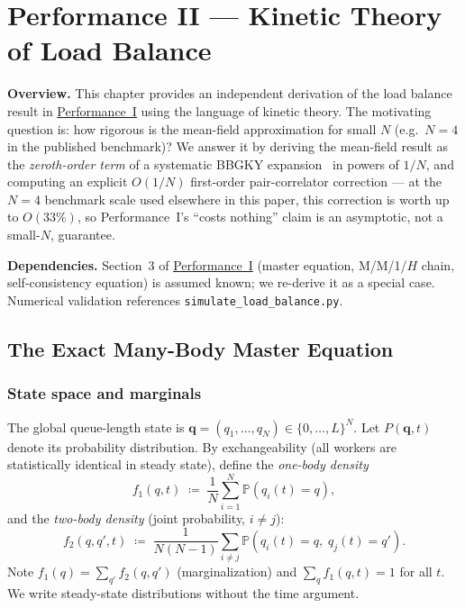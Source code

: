 \documentclass[11pt,a4paper]{report}
\newcommand{\fone}{f_1}
\newcommand{\ftwo}{f_2}
\newcommand{\bP}{\mathbb{P}}
\begin{document}
\chapter{Performance II --- Kinetic Theory of Load Balance}
\label{chap:kinetic_theory}

\bigskip
\noindent\textbf{Overview.}
This chapter provides an independent derivation of the load balance result in
\hyperref[chap:load_balance]{Performance~I} using the language of kinetic theory.
The motivating question is: how rigorous is the mean-field approximation for
small $N$ (e.g.\ $N=4$ in the published benchmark)?
We answer it by deriving the mean-field result as the
\emph{zeroth-order term} of a systematic BBGKY expansion~\cite{bogoliubov1946,born_green1949,kirkwood1946,yvon1935} in powers of $1/N$,
and computing an explicit $O(1/N)$ first-order pair-correlator
correction --- at the $N=4$ benchmark scale used elsewhere in this
paper, this correction is worth up to $O(33\%)$, so Performance~I's
``costs nothing'' claim is an asymptotic, not a small-$N$, guarantee.

\noindent\textbf{Dependencies.}
Section~3 of \hyperref[chap:load_balance]{Performance~I} (master equation, M/M/1/$H$ chain,
self-consistency equation) is assumed known; we re-derive it as a special case.
Numerical validation references \texttt{simulate\_load\_balance.py}.

\section{The Exact Many-Body Master Equation}

\subsection{State space and marginals}

The global queue-length state is
$\mathbf{q} = (q_1, \ldots, q_N) \in \{0, \ldots, L\}^N$.
Let $P(\mathbf{q}, t)$ denote its probability distribution.
By exchangeability (all workers are statistically identical in steady state),
define the \emph{one-body density}
\[
  \fone(q, t) \;\coloneqq\; \frac{1}{N} \sum_{i=1}^N \bP(q_i(t) = q),
\]
and the \emph{two-body density} (joint probability, $i \neq j$):
\[
  \ftwo(q, q', t) \;\coloneqq\; \frac{1}{N(N-1)} \sum_{i \neq j}
  \bP(q_i(t) = q,\; q_j(t) = q').
\]
Note $\fone(q) = \sum_{q'} \ftwo(q,q')$ (marginalization)
and $\sum_q \fone(q,t) = 1$ for all $t$.
We write steady-state distributions without the time argument.
\end{document}
